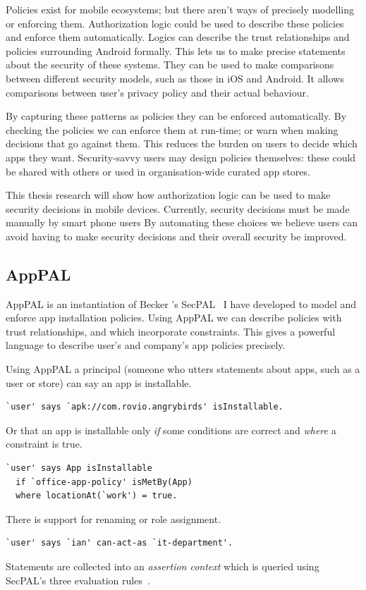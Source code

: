 \documentclass[a4paper]{scrartcl}
\begin{document}
Policies exist for mobile ecosystems; but there aren't ways of precisely modelling or enforcing them.
Authorization logic could be used to describe these policies and enforce them automatically.
Logics can describe the trust relationships and policies surrounding Android formally.
This lets us to make precise statements about the security of these systems.
They can be used to make comparisons between different security models, such as those in iOS and Android.
It allows comparisons between user's privacy policy and their actual behaviour.

By capturing these patterns as policies they can be enforced automatically.
By checking the policies we can enforce them at run-time; or warn when making decisions that go against them.
This reduces the burden on users to decide which apps they want.
Security-savvy users may design policies themselves: these could be shared with others or used in organisation-wide curated app stores.

This thesis research will show how authorization logic can be used to make security decisions in mobile devices.
Currently, security decisions must be made manually by smart phone users
By automating these choices we believe users can avoid having to make security decisions and their overall security be improved.

\subsection{AppPAL}

AppPAL is an instantiation of Becker \etal's SecPAL~\citep{Becker:2006vh} I have developed to model and enforce app installation policies.
Using AppPAL we can describe policies with trust relationships, and which incorporate constraints.
This gives a powerful language to describe user's and company's app policies precisely.

Using AppPAL a principal (someone who utters statements about apps, such as a user or store) can say an app is installable.
\begin{lstlisting}
`user' says `apk://com.rovio.angrybirds' isInstallable.
\end{lstlisting}
Or that an app is installable only \emph{if} some conditions are correct and \emph{where} a constraint is true.
\begin{lstlisting}
`user' says App isInstallable
  if `office-app-policy' isMetBy(App)
  where locationAt(`work') = true.
\end{lstlisting}
There is support for renaming or role assignment.
\begin{lstlisting}
`user' says `ian' can-act-as `it-department'.
\end{lstlisting}
Statements are collected into an \emph{assertion context} which is queried using SecPAL's three evaluation rules~\citep{Becker:2006vh}.
\end{document}
